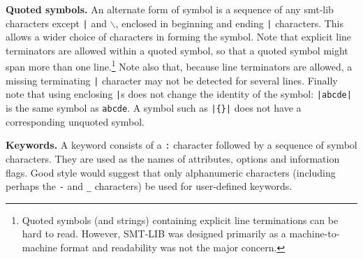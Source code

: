\documentclass[12pt,oneside]{report}
\begin{document}
{\bf Quoted symbols.} An alternate form of symbol is a sequence of any smt-lib characters except {\tt |} and {\tt $\backslash$}, enclosed in beginning and ending {\tt |} characters.
This allows a wider choice of characters in forming the symbol.  Note that explicit line terminators are allowed within a quoted symbol, so that
a quoted symbol might span more than one line.\footnote{Quoted symbols (and strings) containing explicit line terminations can be hard to read. However, SMT-LIB was designed primarily as a machine-to-machine format and readability was not the major concern.}  Note also that, because line terminators are allowed, a missing terminating
{\tt |} character may not be detected for several lines.  Finally note that using enclosing {\tt |}s does not change the identity of the symbol:
\verb!|abcde|! is the same symbol as \verb!abcde!.  A symbol such as \verb!|{}|! does not have a corresponding unquoted symbol.

{\bf Keywords.} A keyword consists of a {\tt :} character followed by a sequence of symbol characters. They are used as the names of  attributes, options and information flags. Good style would suggest that only alphanumeric characters (including perhaps the {\tt -} and {\tt \_} characters) be used for user-defined keywords.
\end{document}
